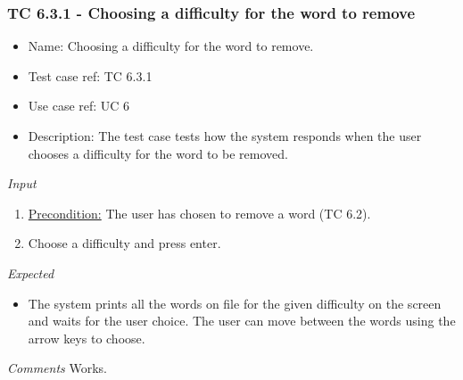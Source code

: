 \documentclass[12pt, letterpaper]{article}
\begin{document}
\subsubsection{TC 6.3.1 - Choosing a difficulty for the word to remove}
\begin{itemize}
	\item Name: Choosing a difficulty for the word to remove.
	\item Test case ref: TC 6.3.1
	\item Use case ref: UC 6
	\item Description: The test case tests how the system responds when the user chooses a difficulty for the word to be removed.
\end{itemize}
\emph{Input}
\begin{enumerate}
	\item \underline{Precondition:} The user has chosen to remove a word (TC 6.2).
	\item Choose a difficulty and press enter.
\end{enumerate}
\emph{Expected}
\begin{itemize}
	\item The system prints all the words on file for the given difficulty on the screen and waits for the user choice. The user can move between the words using the arrow keys to choose.
\end{itemize}
\begin{Form}
	\newline
	\newline
\end{Form}
\newline
\emph{Comments}
Works.
\end{document}
